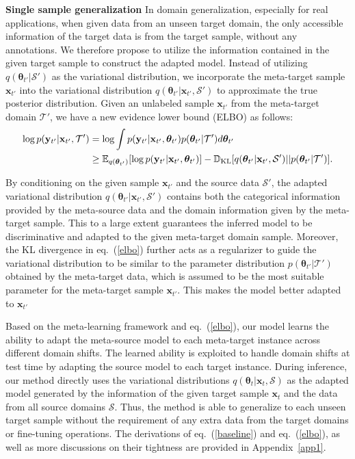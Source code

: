 \documentclass{article} \usepackage[table]{xcolor}
\newcommand{\x}{\mathbf{x}}
\newcommand{\y}{\mathbf{y}}
\newcommand{\dkl}{\mathbb{D}_{\rm{KL}}}
\newcommand{\btheta}{\boldsymbol{\theta}}
\begin{document}
\textbf{Single sample generalization} In domain generalization, especially for real applications, when given data from an unseen target domain, the only accessible information of the target data is from the target sample, without any annotations.
We therefore propose to utilize the information contained in the given target sample to construct the adapted model. 
Instead of utilizing $q(\btheta_{t'}|\mathcal{S'})$ as the variational distribution,
we incorporate the meta-target sample $\x_{t'}$ into the variational distribution $q(\btheta_{t'}|\x_{t'}, \mathcal{S'})$ to approximate the true posterior distribution. Given an unlabeled sample $\x_{t'}$ from the meta-target domain $\mathcal{T'}$, we have a new evidence lower bound (ELBO) as follows:
\begin{equation}
\begin{aligned}
    \log p(\y_{t'}|\x_{t'}, \mathcal{T'}) & = \log \int p(\y_{t'}|\x_{t'}, \btheta_{t'})p(\btheta_{t'}|\mathcal{T'})d\btheta_{t'} \\
    & \geq \mathbb{E}_{q(\btheta_{t'})}[\log p(\y_{t'}|\x_{t'}, \btheta_{t'})] - \dkl [q(\btheta_{t'}|\x_{t'}, \mathcal{S'}) || p(\btheta_{t'}|\mathcal{T'})].
\end{aligned}
\label{elbo}
\end{equation}


By conditioning on the given sample $\x_{t'}$ and the source data $\mathcal{S'}$, the adapted variational distribution $q(\btheta_{t'}|\x_{t'}, \mathcal{S'})$ contains both the categorical information provided by the meta-source data and the domain information given by the meta-target sample. 
This to a large extent guarantees the inferred model to be discriminative and adapted to the given meta-target domain sample. 
Moreover, the KL divergence in eq.~(\ref{elbo}) further acts as a regularizer to guide the variational distribution to be similar to the parameter distribution $p(\btheta_{t'}|\mathcal{T'})$ obtained by the meta-target data, which is assumed to be the most suitable parameter for the meta-target sample $\x_{t'}$. This makes the model better adapted to $\x_{t'}$




Based on the meta-learning framework and eq.~(\ref{elbo}), our model learns the ability to adapt the meta-source model to each meta-target instance across different domain shifts.
The learned ability is exploited to handle domain shifts at test time by adapting the source model to each target instance.
During inference, our method directly uses the variational distributions $q(\btheta_t|\x_t, \mathcal{S})$ as the adapted model generated by the information of the given target sample $\x_t$ and the data from all source domains $\mathcal{S}$. Thus, the method is able to generalize to each unseen target sample without the requirement of any extra data from the target domains or fine-tuning operations. The derivations of eq.~(\ref{baseline}) and eq.~(\ref{elbo}), as well as more discussions on their tightness are provided in Appendix~\ref{app1}. 
\end{document}

